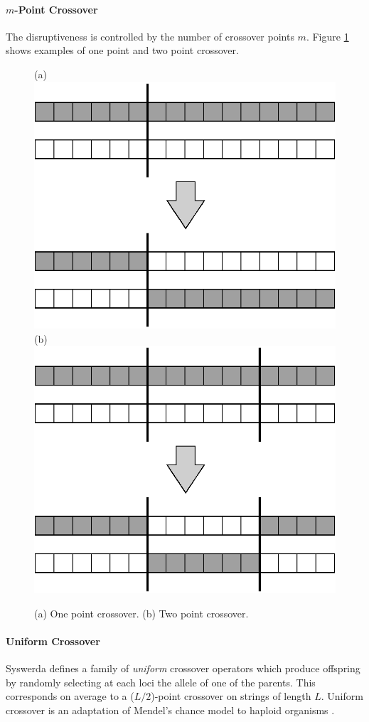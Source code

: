 	\paragraph{$m$-Point Crossover}

The disruptiveness is controlled by the number of crossover points $m$.
Figure \ref{f:crossover} shows examples of one point and two point
crossover.

\begin{figure}[ht]
\centerline{
  \hfill
  (a)~~\includegraphics[width=0.3\columnwidth]{cross1.eps}
  \hfill
  (b)~~\includegraphics[width=0.3\columnwidth]{cross2.eps}
  \hfill
}
\caption[One point and two point crossover]{
  \label{f:crossover}
  (a) One point crossover.
  (b) Two point crossover.
}
\end{figure}
	\paragraph{Uniform Crossover}

Syswerda \cite{Syswerda:89} defines a family of \emph{uniform}
crossover operators which produce offspring by randomly selecting at
each loci the allele of one of the parents.  This corresponds on
average to a ($L/2$)-point crossover on strings of length $L$. Uniform
crossover is an adaptation of Mendel's chance model to haploid
organisms \cite{Asoh:94}.







